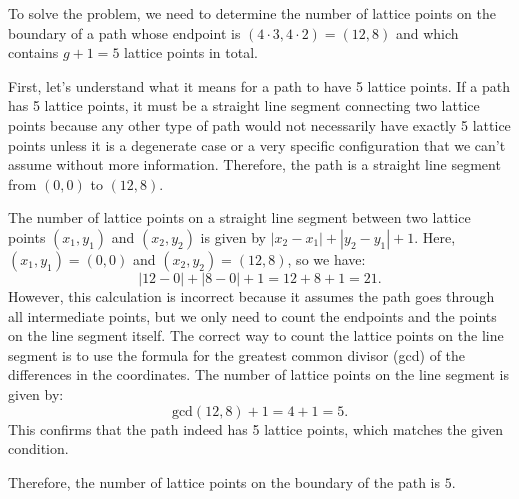 To solve the problem, we need to determine the number of lattice points on the boundary of a path whose endpoint is \((4 \cdot 3, 4 \cdot 2) = (12, 8)\) and which contains \(g+1 = 5\) lattice points in total.

First, let's understand what it means for a path to have 5 lattice points. If a path has 5 lattice points, it must be a straight line segment connecting two lattice points because any other type of path would not necessarily have exactly 5 lattice points unless it is a degenerate case or a very specific configuration that we can't assume without more information. Therefore, the path is a straight line segment from \((0,0)\) to \((12,8)\).

The number of lattice points on a straight line segment between two lattice points \((x_1, y_1)\) and \((x_2, y_2)\) is given by \(|x_2 - x_1| + |y_2 - y_1| + 1\). Here, \((x_1, y_1) = (0,0)\) and \((x_2, y_2) = (12,8)\), so we have:
\[ |12 - 0| + |8 - 0| + 1 = 12 + 8 + 1 = 21. \]
However, this calculation is incorrect because it assumes the path goes through all intermediate points, but we only need to count the endpoints and the points on the line segment itself. The correct way to count the lattice points on the line segment is to use the formula for the greatest common divisor (gcd) of the differences in the coordinates. The number of lattice points on the line segment is given by:
\[ \text{gcd}(12, 8) + 1 = 4 + 1 = 5. \]
This confirms that the path indeed has 5 lattice points, which matches the given condition.

Therefore, the number of lattice points on the boundary of the path is \(\boxed{5}\).